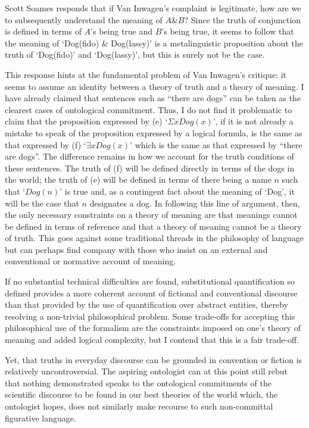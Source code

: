 Scott Soames \cite[p.91]{soames} responds that if Van Inwagen's
complaint is legitimate, how are we to subsequently understand the
meaning of $A \& B$?  Since the truth of conjunction is defined in
terms of $A$'s being true and $B$'s being true, it seems to follow
that the meaning of `Dog(fido) \& Dog(lassy)' is a metalinguistic
proposition about the truth of `Dog(fido)' and `Dog(lassy)', but
this is surely not be the case.

This response hints at the fundamental problem of Van Inwagen's
critique: it seems to assume an identity between a theory of truth and
a theory of meaning. I have already claimed that sentences such as
``there are dogs'' can be taken as the clearest cases of ontological
commitment.  Thus, I do not find it problematic to claim that the
proposition expressed by (e) `$\Sigma xDog(x)$', if it is not already
a mistake to speak of the proposition expressed by a logical formula,
is the same as that expressed by (f) `$\exists xDog(x)$' which is the
same as that expressed by ``there are dogs''.  The difference remains
in how we account for the truth conditions of these sentences.  The
truth of (f) will be defined directly in terms of the dogs in the
world; the truth of (e) will be defined in terms of there being a name
$n$ such that `$Dog(n)$' is true and, as a contingent fact about the
meaning of `Dog', it will be the case that $n$ designates a dog.  In
following this line of argument, then, the only necessary constraints
on a theory of meaning are that meanings cannot be defined in terms of
reference and that a theory of meaning cannot be a theory of
truth. This goes against some traditional threads in the philosophy of
language but can perhaps find company with those who insist on an
external and conventional or normative account of meaning.

If no substantial technical difficulties are found, substitutional
quantification so defined provides a more coherent account of
fictional and conventional discourse than that provided by the use of
quantification over abstract entities, thereby resolving a non-trivial
philosophical problem. Some trade-offs for accepting this
philosophical use of the formalism are the constraints imposed on
one's theory of meaning and added logical complexity, but I contend
that this is a fair trade-off. 

Yet, that truths in everyday discourse can be grounded in convention
or fiction is relatively uncontroversial. The aspiring ontologist can
at this point still rebut that nothing demonstrated speaks to the
ontological commitments of the scientific discourse to be found in our
best theories of the world which, the ontologist hopes, does not
similarly make recourse to such non-committal figurative language.


